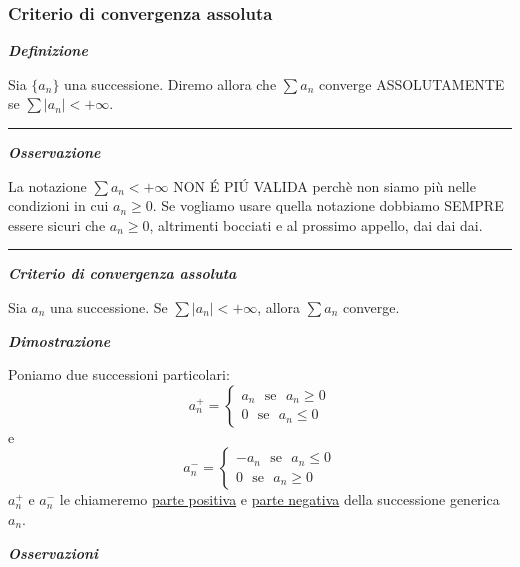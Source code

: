 \documentclass{article}
\theoremstyle{definition}
\begin{document}
\subsubsection{Criterio di convergenza assoluta}
\begin{center}
    \textbf{\textit{Definizione}}
\end{center}
Sia $\{a_n\}$ una successione. Diremo allora che $\sum a_n$ converge ASSOLUTAMENTE se $\sum |a_n| < +\infty$.
\vspace{15pt}
\hrule
\vspace{15pt}
\begin{center}
    \textbf{\textit{Osservazione}}
\end{center}
La notazione $\sum a_n < +\infty$ NON \'E PI\'U VALIDA perchè non siamo più nelle condizioni in cui $a_n \geqslant 0$. Se vogliamo usare quella notazione dobbiamo SEMPRE essere sicuri che $a_n \geqslant 0$, altrimenti bocciati e al prossimo appello, dai dai dai.
\vspace{15pt}
\hrule
\vspace{15pt}
\begin{center}
    \textbf{\textit{Criterio di convergenza assoluta}}
\end{center}
Sia $a_n$ una successione. Se $\sum |a_n| < +\infty $, allora $\sum a_n$ converge.
\\
\begin{center}
    \textbf{\textit{Dimostrazione}}
\end{center}
Poniamo due successioni particolari:
\begin{equation*}
    a_n^+=\begin{cases}
        a_n \,\,\,\, \mbox{se} \,\,\,\, a_n \geqslant 0 \\
        0 \,\,\,\, \mbox{se} \,\,\,\, a_n \leqslant 0
    \end{cases}
\end{equation*}
e
\begin{equation*}
    a_n^-=\begin{cases}
        -a_n \,\,\,\, \mbox{se} \,\,\,\, a_n \leqslant 0 \\
        0 \,\,\,\, \mbox{se} \,\,\,\, a_n \geqslant 0
    \end{cases}
\end{equation*}
$a_n^+$ e $a_n^-$ le chiameremo \underline{parte positiva} e \underline{parte negativa} della successione generica $a_n$.
\begin{center}
    \textbf{\textit{Osservazioni}}
\end{center}
\end{document}

